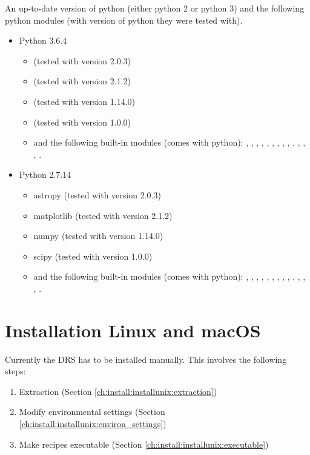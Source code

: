 An up-to-date version of python (either python 2 or python 3) and the following python modules (with version of python they were tested with).
\begin{itemize}
\item Python 3.6.4
	\begin{itemize}
	\item {} (tested with version 2.0.3)
	\item {} (tested with version 2.1.2)
	\item {} (tested with version 1.14.0)
	\item {} (tested with version 1.0.0)
	\item and the following built-in modules (comes with python): 
	, , , , , , , , , , , , , .
	\end{itemize}
\item Python 2.7.14
	\begin{itemize}
	\item astropy (tested with version 2.0.3)
	\item matplotlib (tested with version 2.1.2)
	\item numpy (tested with version 1.14.0)
	\item scipy (tested with version 1.0.0)
	\item and the following built-in modules (comes with python): 
	, , , , , , , , , , , , , .
	\end{itemize}
\end{itemize}


\clearpage
\newpage
\section{Installation Linux and macOS}
\label{ch:install:installunix}

Currently the DRS has to be installed manually. This involves the following steps:
\begin{enumerate}
\item Extraction (Section \ref{ch:install:installunix:extraction})
\item Modify environmental settings (Section \ref{ch:install:installunix:environ_settings})
\item Make recipes executable (Section \ref{ch:install:installunix:executable})
\end{enumerate}

